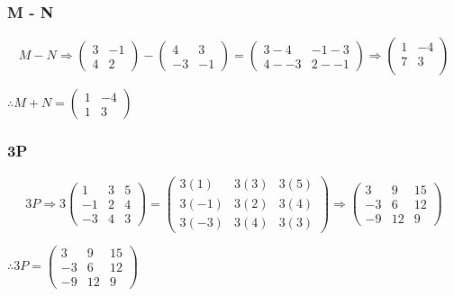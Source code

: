 \documentclass{article}
\begin{document}
\subsubsection{M - N}
\[
M - N \Rightarrow
	\begin{pmatrix}
		3 & -1\\
		4 & 2
	\end{pmatrix}
	-
	\begin{pmatrix}
		4 & 3\\
		-3 & -1
	\end{pmatrix}
	=
	\begin{pmatrix}
		3-4 & -1-3\\
		4--3 & 2--1
	\end{pmatrix}
	\Rightarrow
	\begin{pmatrix}
		1 & -4\\
		7 & 3\\
	\end{pmatrix}
\]
\begin{center}\vspace{0.5cm}$\therefore M+N=\begin{pmatrix} 1 & -4\\ 1 & 3\end{pmatrix}$\end{center}

\subsubsection{3P}
\[
	3P \Rightarrow 3
	\begin{pmatrix}
		1 & 3 & 5\\
		-1 & 2 & 4\\
		-3 & 4 & 3
	\end{pmatrix}
	=
	\begin{pmatrix}
		3(1) & 3(3) & 3(5)\\
		3(-1) & 3(2) & 3(4)\\
		3(-3) & 3(4) & 3(3)
	\end{pmatrix}
	\Rightarrow
	\begin{pmatrix}
		3 & 9 & 15\\
		-3 & 6 & 12\\
		-9 & 12 & 9
	\end{pmatrix}
\]
\begin{center}\vspace{0.5cm}$\therefore 3P=\begin{pmatrix} 3 & 9 & 15\\ -3 & 6 & 12\\ -9 & 12 & 9\end{pmatrix}$\end{center}
\end{document}
